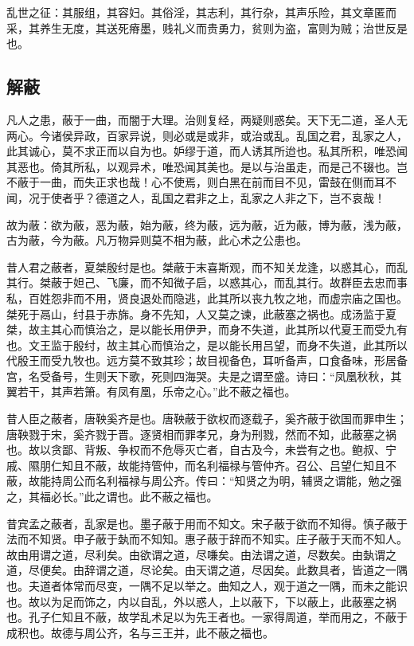 \documentclass[]{article}
\begin{document}
乱世之征：其服组，其容妇。其俗淫，其志利，其行杂，其声乐险，其文章匿而采，其养生无度，其送死瘠墨，贱礼义而贵勇力，贫则为盗，富则为贼；治世反是也。

\hypertarget{header-n92}{%
\subsection{解蔽}\label{header-n92}}

凡人之患，蔽于一曲，而闇于大理。治则复经，两疑则惑矣。天下无二道，圣人无两心。今诸侯异政，百家异说，则必或是或非，或治或乱。乱国之君，乱家之人，此其诚心，莫不求正而以自为也。妒缪于道，而人诱其所迨也。私其所积，唯恐闻其恶也。倚其所私，以观异术，唯恐闻其美也。是以与治虽走，而是己不辍也。岂不蔽于一曲，而失正求也哉！心不使焉，则白黑在前而目不见，雷鼓在侧而耳不闻，况于使者乎？德道之人，乱国之君非之上，乱家之人非之下，岂不哀哉！

故为蔽：欲为蔽，恶为蔽，始为蔽，终为蔽，远为蔽，近为蔽，博为蔽，浅为蔽，古为蔽，今为蔽。凡万物异则莫不相为蔽，此心术之公患也。

昔人君之蔽者，夏桀殷纣是也。桀蔽于末喜斯观，而不知关龙逢，以惑其心，而乱其行。桀蔽于妲己、飞廉，而不知微子启，以惑其心，而乱其行。故群臣去忠而事私，百姓怨非而不用，贤良退处而隐逃，此其所以丧九牧之地，而虚宗庙之国也。桀死于鬲山，纣县于赤旆。身不先知，人又莫之谏，此蔽塞之祸也。成汤监于夏桀，故主其心而慎治之，是以能长用伊尹，而身不失道，此其所以代夏王而受九有也。文王监于殷纣，故主其心而慎治之，是以能长用吕望，而身不失道，此其所以代殷王而受九牧也。远方莫不致其珍；故目视备色，耳听备声，口食备味，形居备宫，名受备号，生则天下歌，死则四海哭。夫是之谓至盛。诗曰：``凤凰秋秋，其翼若干，其声若箫。有凤有凰，乐帝之心。''此不蔽之福也。

昔人臣之蔽者，唐鞅奚齐是也。唐鞅蔽于欲权而逐载子，奚齐蔽于欲国而罪申生；唐鞅戮于宋，奚齐戮于晋。逐贤相而罪孝兄，身为刑戮，然而不知，此蔽塞之祸也。故以贪鄙、背叛、争权而不危辱灭亡者，自古及今，未尝有之也。鲍叔、宁戚、隰朋仁知且不蔽，故能持管仲，而名利福禄与管仲齐。召公、吕望仁知且不蔽，故能持周公而名利福禄与周公齐。传曰：``知贤之为明，辅贤之谓能，勉之强之，其福必长。''此之谓也。此不蔽之福也。

昔宾孟之蔽者，乱家是也。墨子蔽于用而不知文。宋子蔽于欲而不知得。慎子蔽于法而不知贤。申子蔽于埶而不知知。惠子蔽于辞而不知实。庄子蔽于天而不知人。故由用谓之道，尽利矣。由欲谓之道，尽嗛矣。由法谓之道，尽数矣。由埶谓之道，尽便矣。由辞谓之道，尽论矣。由天谓之道，尽因矣。此数具者，皆道之一隅也。夫道者体常而尽变，一隅不足以举之。曲知之人，观于道之一隅，而未之能识也。故以为足而饰之，内以自乱，外以惑人，上以蔽下，下以蔽上，此蔽塞之祸也。孔子仁知且不蔽，故学乱术足以为先王者也。一家得周道，举而用之，不蔽于成积也。故德与周公齐，名与三王并，此不蔽之福也。
\end{document}
